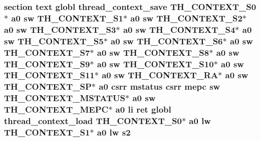 \hypertarget{riscv_2threada_8S_a471d090c1a9e7f788067d9f57a793ec5}{
\subsubsection[{s2}]{\setlength{\rightskip}{0pt plus 5cm}section text globl {\bf thread\-\_\-context\-\_\-save} {\bf T\-H\-\_\-\-C\-O\-N\-T\-E\-X\-T\-\_\-\-S0}$\ast$ {\bf a0} {\bf sw} {\bf T\-H\-\_\-\-C\-O\-N\-T\-E\-X\-T\-\_\-\-S1}$\ast$ {\bf a0} {\bf sw} {\bf T\-H\-\_\-\-C\-O\-N\-T\-E\-X\-T\-\_\-\-S2}$\ast$ {\bf a0} {\bf sw} {\bf T\-H\-\_\-\-C\-O\-N\-T\-E\-X\-T\-\_\-\-S3}$\ast$ {\bf a0} {\bf sw} {\bf T\-H\-\_\-\-C\-O\-N\-T\-E\-X\-T\-\_\-\-S4}$\ast$ {\bf a0} {\bf sw} {\bf T\-H\-\_\-\-C\-O\-N\-T\-E\-X\-T\-\_\-\-S5}$\ast$ {\bf a0} {\bf sw} {\bf T\-H\-\_\-\-C\-O\-N\-T\-E\-X\-T\-\_\-\-S6}$\ast$ {\bf a0} {\bf sw} {\bf T\-H\-\_\-\-C\-O\-N\-T\-E\-X\-T\-\_\-\-S7}$\ast$ {\bf a0} {\bf sw} {\bf T\-H\-\_\-\-C\-O\-N\-T\-E\-X\-T\-\_\-\-S8}$\ast$ {\bf a0} {\bf sw} {\bf T\-H\-\_\-\-C\-O\-N\-T\-E\-X\-T\-\_\-\-S9}$\ast$ {\bf a0} {\bf sw} {\bf T\-H\-\_\-\-C\-O\-N\-T\-E\-X\-T\-\_\-\-S10}$\ast$ {\bf a0} {\bf sw} {\bf T\-H\-\_\-\-C\-O\-N\-T\-E\-X\-T\-\_\-\-S11}$\ast$ {\bf a0} {\bf sw} {\bf T\-H\-\_\-\-C\-O\-N\-T\-E\-X\-T\-\_\-\-R\-A}$\ast$ {\bf a0} {\bf sw} {\bf T\-H\-\_\-\-C\-O\-N\-T\-E\-X\-T\-\_\-\-S\-P}$\ast$ {\bf a0} csrr {\bf mstatus} csrr {\bf mepc} {\bf sw} {\bf T\-H\-\_\-\-C\-O\-N\-T\-E\-X\-T\-\_\-\-M\-S\-T\-A\-T\-U\-S}$\ast$ {\bf a0} {\bf sw} {\bf T\-H\-\_\-\-C\-O\-N\-T\-E\-X\-T\-\_\-\-M\-E\-P\-C}$\ast$ {\bf a0} {\bf li} ret globl {\bf thread\-\_\-context\-\_\-load} {\bf T\-H\-\_\-\-C\-O\-N\-T\-E\-X\-T\-\_\-\-S0}$\ast$ {\bf a0} {\bf lw} {\bf T\-H\-\_\-\-C\-O\-N\-T\-E\-X\-T\-\_\-\-S1}$\ast$ {\bf a0} {\bf lw} s2}}\label{riscv_2threada_8S_a471d090c1a9e7f788067d9f57a793ec5}
